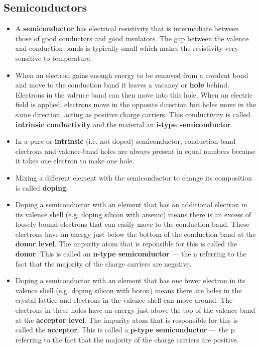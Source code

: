 \documentclass{article}
\begin{document}
\subsection{Semiconductors}

\begin{itemize}
  \item A \textbf{semiconductor} has electrical resistivity that is intermediate between those of good conductors and good insulators. The gap between the valence and conduction bands is typically small which makes the resistivity very sensitive to temperature.

  \item When an electron gains enough energy to be removed from a covalent bond and move to the conduction band it leaves a vacancy or \textbf{hole} behind. Electrons in the valence band can then move into this hole. When an electric field is applied, electrons move in the opposite direction but holes move in the same direction, acting as positive charge carriers. This conductivity is called \textbf{intrinsic conductivity} and the material an \textbf{i-type semiconductor}.

  \item In a pure or \textbf{intrinsic} (i.e. not doped) semiconductor, conduction-band electrons and valence-band holes are always present in equal numbers because it takes one electron to make one hole.

  \item Mixing a different element with the semiconductor to change its composition is called \textbf{doping}.

  \item Doping a semiconductor with an element that has an additional electron in its valence shell (e.g. doping silicon with arsenic) means there is an excess of loosely bound electrons that can easily move to the conduction band. These electrons have an energy just below the bottom of the conduction band at the \textbf{donor level}. The impurity atom that is reponsible for this is called the \textbf{donor}. This is called an \textbf{n-type semiconductor} — the n referring to the fact that the majority of the charge carriers are negative.

  \item Doping a semiconductor with an element that has one fewer electron in its valence shell (e.g. doping silicon with boron) means there are holes in the crystal lattice and electrons in the valence shell can move around. The electrons in these holes have an energy just above the top of the valence band at the \textbf{acceptor level}. The impurity atom that is responsible for this is called the \textbf{acceptor}. This is called a \textbf{p-type semiconductor} — the p referring to the fact that the majority of the charge carriers are positive.
\end{itemize}
\end{document}

